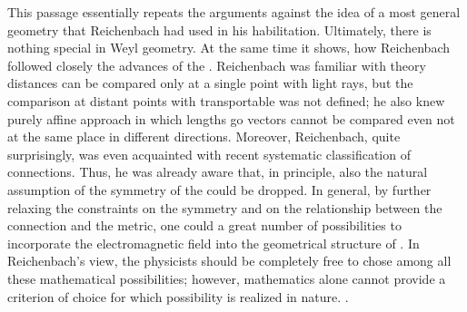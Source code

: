 \documentclass[draft]{article}
\begin{document}
%
This passage essentially repeats the arguments against the idea of a most general geometry that Reichenbach had used in his habilitation. Ultimately, there is nothing special in Weyl geometry. At the same time it shows, how Reichenbach followed closely the advances of the \uftp. Reichenbach was familiar with   theory distances can be compared only at a single point with light rays, but the comparison at distant points with transportable \rac was not defined; he also knew  purely affine approach in which lengths go vectors cannot be compared even not at the same place in different directions. Moreover, Reichenbach, quite surprisingly, was even acquainted with  recent systematic classification of connections. Thus, he was already aware that, in principle, also the natural assumption of the symmetry of the \Gtmn could be dropped. In general, by further relaxing the constraints on the symmetry and on the relationship between the connection and the metric, one could a great number of possibilities to incorporate the electromagnetic field into the geometrical structure of \spti. In Reichenbach's view, the physicists should be completely free to chose among all these mathematical possibilities; however, mathematics alone cannot provide a criterion of choice for which possibility is realized in nature. .

\end{document}
